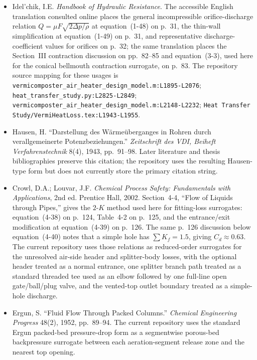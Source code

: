 \documentclass[11pt]{article}
\newcommand{\srcref}[1]{\nolinkurl{#1}}
\begin{document}
\begin{itemize}[leftmargin=*]
\item [R12] Idel'chik, I.E. \emph{Handbook of Hydraulic Resistance}. The accessible English translation consulted online places the general incompressible orifice-discharge relation \(Q=\mu F\sqrt{2\Delta p/\rho}\) at equation~(1-48) on p.~31, the thin-wall simplification at equation~(1-49) on p.~31, and representative discharge-coefficient values for orifices on p.~32; the same translation places the Section~III contraction discussion on pp.~82--85 and equation~(3-3), used here for the conical bellmouth contraction surrogate, on p.~83. The repository source mapping for these usages is \srcref{vermicomposter_air_heater_design_model.m:L1895-L2076}; \srcref{heat_transfer_study.py:L2825-L2849}; \srcref{vermicomposter_air_heater_design_model.m:L2148-L2232}; \srcref{Heat Transfer Study/VermiHeatLoss.tex:L1943-L1955}.
\item [R13] Hausen, H. ``Darstellung des W\"{a}rme\"{u}berganges in Rohren durch verallgemeinerte Potenzbeziehungen.'' \emph{Zeitschrift des VDI, Beiheft Verfahrenstechnik} 8(4), 1943, pp.~91--98. Later literature and thesis bibliographies preserve this citation; the repository uses the resulting Hausen-type form but does not currently store the primary citation string.
\item [R14] Crowl, D.A.; Louvar, J.F. \emph{Chemical Process Safety: Fundamentals with Applications}, 2nd ed. Prentice Hall, 2002. Section~4-4, ``Flow of Liquids through Pipes,'' gives the \(2\)-\(K\) method used here for fitting-loss surrogates: equation~(4-38) on p.~124, Table~4-2 on p.~125, and the entrance/exit modification at equation~(4-39) on p.~126. The same p.~126 discussion below equation~(4-40) notes that a simple hole has \(\sum K_f=1.5\), giving \(C_d\approx0.63\). The current repository uses those relations as reduced-order surrogates for the unresolved air-side header and splitter-body losses, with the optional header treated as a normal entrance, one splitter branch path treated as a standard threaded tee used as an elbow followed by one full-line open gate/ball/plug valve, and the vented-top outlet boundary treated as a simple-hole discharge.
\item [R15] Ergun, S. ``Fluid Flow Through Packed Columns.'' \emph{Chemical Engineering Progress} 48(2), 1952, pp.~89--94. The current repository uses the standard Ergun packed-bed pressure-drop form as a segmentwise porous-bed backpressure surrogate between each aeration-segment release zone and the nearest top opening.

\end{itemize}
\end{document}
